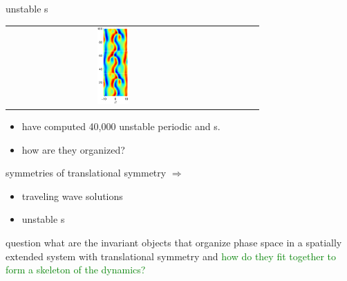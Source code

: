 \documentclass{beamer}
\begin{document}
\begin{frame}{unstable \rpo s}
\begin{tabular}{ccccc}
\includegraphics[width=0.15\textwidth,clip=true]{../../figs/ks22rpo066.8-00.00.eps}\\
  \end{tabular}

\begin{itemize}
 \item have computed 40,000 unstable periodic and \rpo s.
 \item how are they organized?
\end{itemize}

\end{frame}

\begin{frame}{symmetries of \KSe}
translational symmetry $\Rightarrow$
\begin{itemize}
 \item traveling wave solutions
 \item unstable \rpo s
\end{itemize}

\begin{block}{question}
what are the invariant objects that organize phase space in a spatially extended system
with translational symmetry and \textcolor{green}{how do they fit together to form a
skeleton of the dynamics?}
\end{block}
\end{frame}
\end{document}
